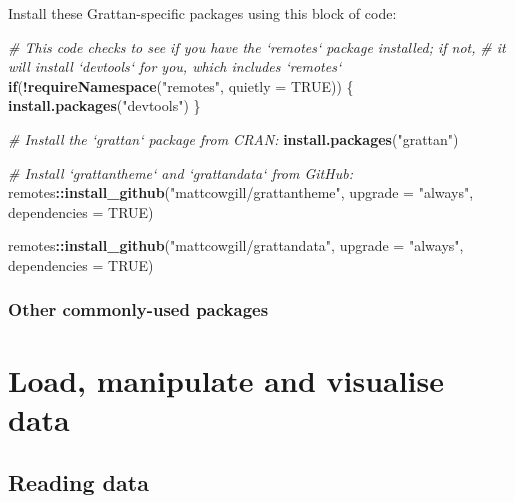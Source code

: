 \documentclass[]{book}
\newenvironment{Shaded}{\begin{snugshade}}{\end{snugshade}}
\newcommand{\CommentTok}[1]{\textcolor[rgb]{0.56,0.35,0.01}{\textit{#1}}}
\newcommand{\ControlFlowTok}[1]{\textcolor[rgb]{0.13,0.29,0.53}{\textbf{#1}}}
\newcommand{\DataTypeTok}[1]{\textcolor[rgb]{0.13,0.29,0.53}{#1}}
\newcommand{\KeywordTok}[1]{\textcolor[rgb]{0.13,0.29,0.53}{\textbf{#1}}}
\newcommand{\NormalTok}[1]{#1}
\newcommand{\OperatorTok}[1]{\textcolor[rgb]{0.81,0.36,0.00}{\textbf{#1}}}
\newcommand{\OtherTok}[1]{\textcolor[rgb]{0.56,0.35,0.01}{#1}}
\newcommand{\StringTok}[1]{\textcolor[rgb]{0.31,0.60,0.02}{#1}}
\begin{document}
Install these Grattan-specific packages using this block of code:

\begin{Shaded}
\begin{Highlighting}[]
\CommentTok{# This code checks to see if you have the `remotes` package installed; if not,}
\CommentTok{# it will install `devtools` for you, which includes `remotes`}
\ControlFlowTok{if}\NormalTok{(}\OperatorTok{!}\KeywordTok{requireNamespace}\NormalTok{(}\StringTok{"remotes"}\NormalTok{, }\DataTypeTok{quietly =} \OtherTok{TRUE}\NormalTok{)) \{}
  \KeywordTok{install.packages}\NormalTok{(}\StringTok{"devtools"}\NormalTok{)}
\NormalTok{\}}

\CommentTok{# Install the `grattan` package from CRAN:}
\KeywordTok{install.packages}\NormalTok{(}\StringTok{"grattan"}\NormalTok{)}

\CommentTok{# Install `grattantheme` and `grattandata` from GitHub:}
\NormalTok{remotes}\OperatorTok{::}\KeywordTok{install_github}\NormalTok{(}\StringTok{"mattcowgill/grattantheme"}\NormalTok{,}
                        \DataTypeTok{upgrade =} \StringTok{"always"}\NormalTok{,}
                        \DataTypeTok{dependencies =} \OtherTok{TRUE}\NormalTok{)}

\NormalTok{remotes}\OperatorTok{::}\KeywordTok{install_github}\NormalTok{(}\StringTok{"mattcowgill/grattandata"}\NormalTok{,}
                        \DataTypeTok{upgrade =} \StringTok{"always"}\NormalTok{,}
                        \DataTypeTok{dependencies =} \OtherTok{TRUE}\NormalTok{)}
\end{Highlighting}
\end{Shaded}

\hypertarget{other-commonly-used-packages}{%
\section{Other commonly-used packages}\label{other-commonly-used-packages}}

\hypertarget{part-load-manipulate-and-visualise-data}{%
\part{Load, manipulate and visualise data}\label{part-load-manipulate-and-visualise-data}}

\hypertarget{reading-data}{%
\chapter{Reading data}\label{reading-data}}
\end{document}
